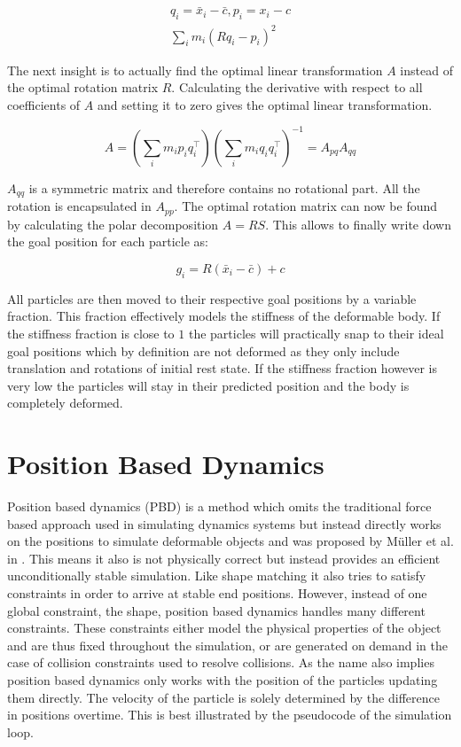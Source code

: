 \begin{gather}
q_i = \bar{x}_i - \bar{c}, p_i = x_i - c \\
\sum\limits_i m_i(Rq_i-p_i)^2
\label{eq:center_of_mass_shape_matching}
\end{gather}

The next insight is to actually find the optimal linear transformation \(A\) instead of the optimal rotation matrix \(R\).  Calculating the derivative with respect to all coefficients of \(A\) and setting it to zero gives the optimal linear transformation.

\begin{equation}
A = (\sum_i m_i p_i q_i^\top)(\sum_i m_i q_i q_i^\top)^{-1}=A_{pq}A_{qq}
\end{equation}

\(A_{qq}\) is a symmetric matrix and therefore contains no rotational part. All the rotation is encapsulated in \(A_{pp}\). The optimal rotation matrix can now be found by calculating the polar decomposition \(A = RS\). This allows to finally write down the goal position for each particle as:

\begin{equation}
g_i = R(\bar{x}_i - \bar{c}) + c
\end{equation}

All particles are then moved to their respective goal positions by a variable fraction. This fraction effectively models the stiffness of the deformable body. If the stiffness fraction is close to $1$ the particles will practically snap to their ideal goal positions which by definition are not deformed as they only include translation and rotations of initial rest state. If the stiffness fraction however is very low the particles will stay in their predicted position and the body is completely deformed.

\section{Position Based Dynamics}
\label{sec:position_based_dynamics}

Position based dynamics (PBD) is a method which omits the traditional force based approach used in simulating dynamics systems but instead directly works on the positions to simulate deformable objects and was proposed by M{\"u}ller et al. in \cite{Muller:2007vs}. This means it also is not physically correct but instead provides an efficient unconditionally stable simulation. Like shape matching it also tries to satisfy constraints in order to arrive at stable end positions. However, instead of one global constraint, the shape, position based dynamics handles many different constraints. These constraints either model the physical properties of the object and are thus fixed throughout the simulation, or are generated on demand in the case of collision constraints used to resolve collisions. As the name also implies position based dynamics only works with the position of the particles updating them directly. The velocity of the particle is solely determined by the difference in positions overtime. This is best illustrated by the pseudocode of the simulation loop.

